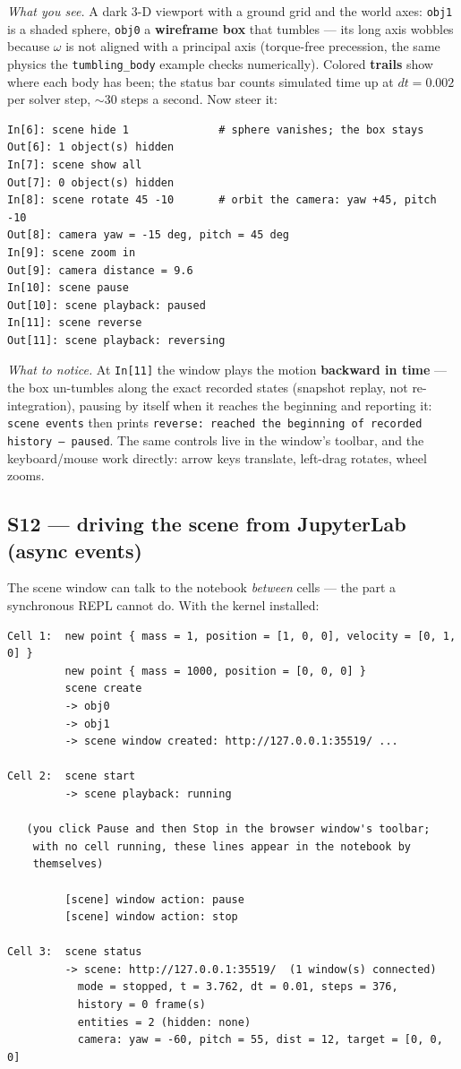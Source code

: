 \documentclass[11pt]{article}
\newcommand{\code}[1]{\texttt{#1}}
\begin{document}
\emph{What you see.} A dark 3-D viewport with a ground grid and the
world axes: \code{obj1} is a shaded sphere, \code{obj0} a
\textbf{wireframe box} that tumbles --- its long axis wobbles because
$\omega$ is not aligned with a principal axis (torque-free precession,
the same physics the \code{tumbling\_body} example checks numerically).
Colored \textbf{trails} show where each body has been; the status bar
counts simulated time up at $dt = 0.002$ per solver step, $\sim$30
steps a second. Now steer it:

\begin{lstlisting}
In[6]: scene hide 1              # sphere vanishes; the box stays
Out[6]: 1 object(s) hidden
In[7]: scene show all
Out[7]: 0 object(s) hidden
In[8]: scene rotate 45 -10       # orbit the camera: yaw +45, pitch -10
Out[8]: camera yaw = -15 deg, pitch = 45 deg
In[9]: scene zoom in
Out[9]: camera distance = 9.6
In[10]: scene pause
Out[10]: scene playback: paused
In[11]: scene reverse
Out[11]: scene playback: reversing
\end{lstlisting}

\emph{What to notice.} At \code{In[11]} the window plays the motion
\textbf{backward in time} --- the box un-tumbles along the exact
recorded states (snapshot replay, not re-integration), pausing by
itself when it reaches the beginning and reporting it:
\code{scene events} then prints \code{reverse: reached the beginning of
recorded history --- paused}. The same controls live in the window's
toolbar, and the keyboard/mouse work directly: arrow keys translate,
left-drag rotates, wheel zooms.

\subsection{S12 --- driving the scene from JupyterLab (async events)}

The scene window can talk to the notebook \emph{between} cells --- the
part a synchronous REPL cannot do. With the kernel installed:

\begin{lstlisting}
Cell 1:  new point { mass = 1, position = [1, 0, 0], velocity = [0, 1, 0] }
         new point { mass = 1000, position = [0, 0, 0] }
         scene create
         -> obj0
         -> obj1
         -> scene window created: http://127.0.0.1:35519/ ...

Cell 2:  scene start
         -> scene playback: running

   (you click Pause and then Stop in the browser window's toolbar;
    with no cell running, these lines appear in the notebook by
    themselves)

         [scene] window action: pause
         [scene] window action: stop

Cell 3:  scene status
         -> scene: http://127.0.0.1:35519/  (1 window(s) connected)
           mode = stopped, t = 3.762, dt = 0.01, steps = 376,
           history = 0 frame(s)
           entities = 2 (hidden: none)
           camera: yaw = -60, pitch = 55, dist = 12, target = [0, 0, 0]
\end{lstlisting}
\end{document}
